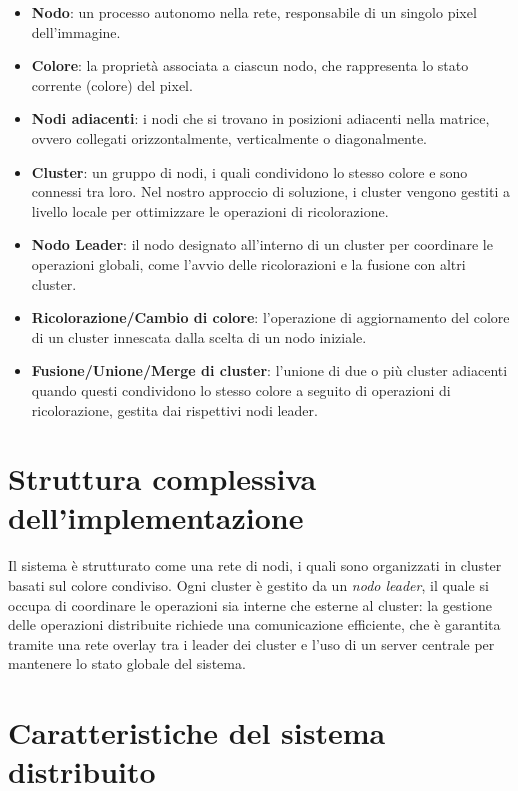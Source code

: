 \documentclass[12pt, a4paper]{report}
\begin{document}
\begin{itemize}[label=]
    \item \textbf{Nodo}: un processo autonomo nella rete, responsabile di un singolo pixel dell'immagine.
    \item \textbf{Colore}: la propriet\`a associata a ciascun nodo, che rappresenta lo stato corrente (colore) del pixel.
    \item \textbf{Nodi adiacenti}: i nodi che si trovano in posizioni adiacenti nella matrice, ovvero collegati orizzontalmente, verticalmente o diagonalmente.
    \item \textbf{Cluster}: un gruppo di nodi, i quali condividono lo stesso colore e sono connessi tra loro. Nel nostro approccio di soluzione, i cluster vengono gestiti a livello locale per ottimizzare le operazioni di ricolorazione.
    \item \textbf{Nodo Leader}: il nodo designato all'interno di un cluster per coordinare le operazioni globali, come l'avvio delle ricolorazioni e la fusione con altri cluster.
    \item \textbf{Ricolorazione/Cambio di colore}: l'operazione di aggiornamento del colore di un cluster innescata dalla scelta di un nodo iniziale.
    \item \textbf{Fusione/Unione/Merge di cluster}: l'unione di due o pi\`u cluster adiacenti quando questi condividono lo stesso colore a seguito di operazioni di ricolorazione, gestita dai rispettivi nodi leader.
\end{itemize}

\section{Struttura complessiva dell'implementazione}

Il sistema \`e strutturato come una rete di nodi, i quali sono organizzati in cluster basati sul colore condiviso. Ogni cluster \`e gestito da un \emph{nodo leader}, il quale si occupa di coordinare le operazioni sia interne che esterne al cluster: la gestione delle operazioni distribuite richiede una comunicazione efficiente, che \`e garantita tramite una rete overlay tra i leader dei cluster e l'uso di un server centrale per mantenere lo stato globale del sistema.

\section{Caratteristiche del sistema distribuito}
\end{document}
